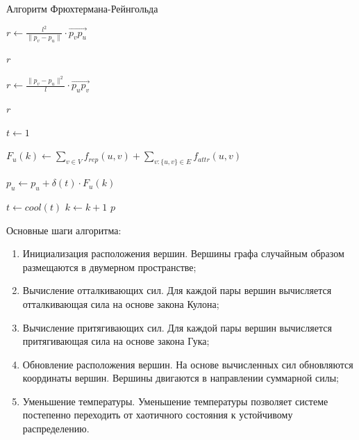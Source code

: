 \documentclass[14pt, russian]{scrartcl}
\begin{document}
\begin{algorithm}[H]
\caption{Алгоритм Фрюхтермана-Рейнгольда}\label{alg:fr_algorithm}
\begin{algorithmic}

  \State $r \gets \frac{l^2}{\|p_v - p_u \|}  \cdot \overrightarrow{p_v p_u}  $
  
  \Return $r$  
  \EndFunction

 
  \State $r \gets \frac{\|p_v - p_u \|^2}{l} \cdot \overrightarrow{p_u p_v}  $
  
  \Return $r$  
  \EndFunction
 

	\State $t \gets 1$

			\State $F_{u}(k) \gets \sum_{v \in V}{f_{rep}(u, v)} + \sum_{v:\{u,v\} \in E}{f_{attr}(u, v)}$
		

		\EndFor
      \State $p_u \gets p_u + \delta(t) \cdot F_u(k)$
		\EndFor
		
    \State $t \gets cool(t)$
		\State $k \gets k + 1$
	\EndWhile
	\Return $p$
	\EndFunction

\end{algorithmic}
\end{algorithm}

Основные шаги алгоритма:

\begin{enumerate}
  \item{Инициализация расположения вершин. Вершины графа случайным образом размещаются в двумерном пространстве;}
  \item{Вычисление отталкивающих сил. Для каждой пары вершин вычисляется отталкивающая сила на основе закона Кулона;}
  \item{Вычисление притягивающих сил. Для каждой пары вершин вычисляется притягивающая сила на основе закона Гука;}
  \item{Обновление расположения вершин. На основе вычисленных сил обновляются координаты вершин. Вершины двигаются в направлении суммарной силы;}
  \item{Уменьшение температуры. Уменьшение температуры позволяет системе постепенно переходить от хаотичного состояния к устойчивому распределению.
}

\end{enumerate}

 \newpage 
\end{document}
